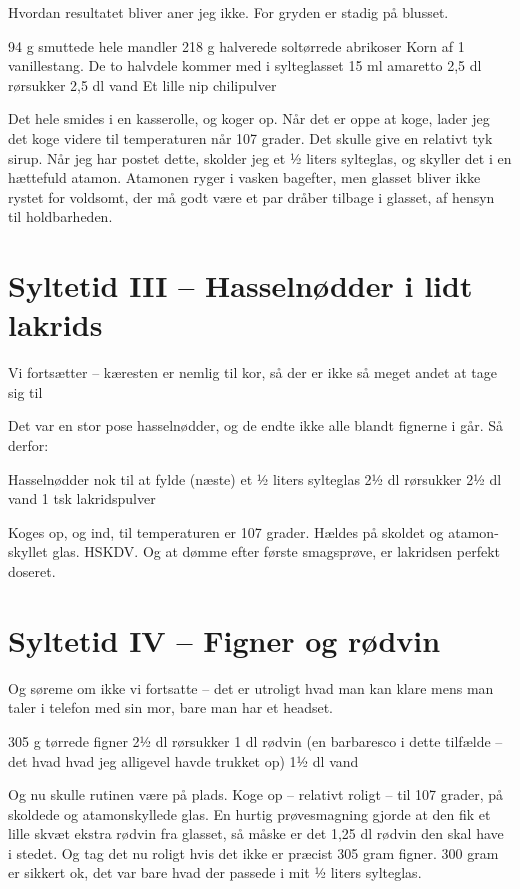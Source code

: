 \documentclass[
  letterpaper,
  DIV=11,
  numbers=noendperiod]{scrreprt}
\begin{document}
Hvordan resultatet bliver aner jeg ikke. For gryden er stadig på
blusset.

94 g smuttede hele mandler 218 g halverede soltørrede abrikoser Korn af
1 vanillestang. De to halvdele kommer med i sylteglasset 15 ml amaretto
2,5 dl rørsukker 2,5 dl vand Et lille nip chilipulver

Det hele smides i en kasserolle, og koger op. Når det er oppe at koge,
lader jeg det koge videre til temperaturen når 107 grader. Det skulle
give en relativt tyk sirup. Når jeg har postet dette, skolder jeg et ½
liters sylteglas, og skyller det i en hættefuld atamon. Atamonen ryger i
vasken bagefter, men glasset bliver ikke rystet for voldsomt, der må
godt være et par dråber tilbage i glasset, af hensyn til holdbarheden.

\hypertarget{syltetid-iii-hasselnuxf8dder-i-lidt-lakrids}{%
\section{Syltetid III -- Hasselnødder i lidt
lakrids}\label{syltetid-iii-hasselnuxf8dder-i-lidt-lakrids}}

Vi fortsætter -- kæresten er nemlig til kor, så der er ikke så meget
andet at tage sig til

Det var en stor pose hasselnødder, og de endte ikke alle blandt fignerne
i går. Så derfor:

Hasselnødder nok til at fylde (næste) et ½ liters sylteglas 2½ dl
rørsukker 2½ dl vand 1 tsk lakridspulver

Koges op, og ind, til temperaturen er 107 grader. Hældes på skoldet og
atamon-skyllet glas. HSKDV. Og at dømme efter første smagsprøve, er
lakridsen perfekt doseret.

\hypertarget{syltetid-iv-figner-og-ruxf8dvin}{%
\section{Syltetid IV -- Figner og
rødvin}\label{syltetid-iv-figner-og-ruxf8dvin}}

Og søreme om ikke vi fortsatte -- det er utroligt hvad man kan klare
mens man taler i telefon med sin mor, bare man har et headset.

305 g tørrede figner 2½ dl rørsukker 1 dl rødvin (en barbaresco i dette
tilfælde -- det hvad hvad jeg alligevel havde trukket op) 1½ dl vand

Og nu skulle rutinen være på plads. Koge op -- relativt roligt -- til
107 grader, på skoldede og atamonskyllede glas. En hurtig prøvesmagning
gjorde at den fik et lille skvæt ekstra rødvin fra glasset, så måske er
det 1,25 dl rødvin den skal have i stedet. Og tag det nu roligt hvis det
ikke er præcist 305 gram figner. 300 gram er sikkert ok, det var bare
hvad der passede i mit ½ liters sylteglas.
\end{document}
